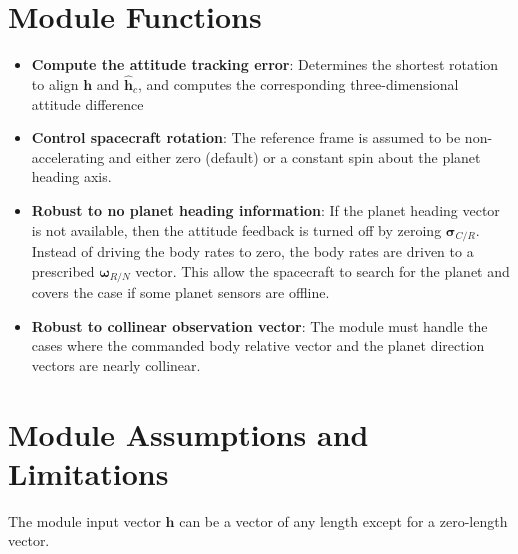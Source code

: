 

\section{Module Functions}
\begin{itemize}
	\item \textbf{Compute the attitude tracking error}: Determines the shortest rotation to align $\bm h$ and $\hat{\bm h}_{c}$, and computes the corresponding three-dimensional attitude difference
	\item \textbf{Control spacecraft rotation}: The reference frame is assumed to be non-accelerating and either zero (default) or a constant spin about the planet heading axis.
	
	\item \textbf{Robust to no planet heading information}: If the planet heading vector is not available, then the attitude feedback is turned off by zeroing $\bm\sigma_{C/R}$.  Instead of driving the body rates to zero, the body rates are driven to a prescribed $\bm\omega_{R/N}$ vector.  This allow the spacecraft to search for the planet and covers the case if some planet sensors are offline.  
	
	\item \textbf{Robust to collinear observation vector}:  The module must handle the cases where the commanded body relative vector and the planet direction vectors are nearly collinear. 
\end{itemize}

\section{Module Assumptions and Limitations}
The module input vector $\bm h$ can be a vector of any length except for a zero-length vector.  %